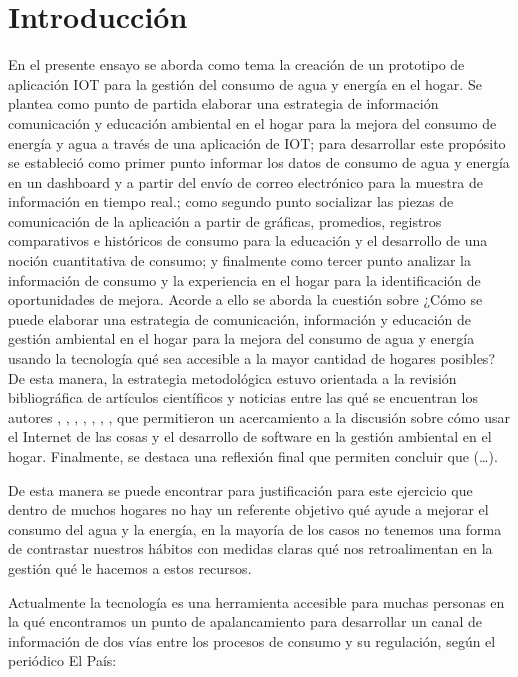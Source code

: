 \documentclass[a4paper,man,natbib]{apa6}
\begin{document}


\section{Introducción}
En el presente ensayo se aborda como tema la creación de un prototipo de aplicación IOT para la gestión del consumo de agua y energía en el hogar. Se plantea como punto de partida elaborar una estrategia de información comunicación y educación ambiental en el hogar para la mejora del consumo de energía y agua a través de una aplicación de IOT; para desarrollar este propósito se estableció como primer punto informar los datos de consumo de agua y energía en un dashboard y a partir del envío de correo electrónico para la muestra de información en tiempo real.; como segundo punto socializar las piezas de comunicación de la aplicación a partir de gráficas, promedios, registros comparativos e históricos de consumo para la educación y el desarrollo de una noción cuantitativa de consumo; y finalmente como tercer punto analizar la información de consumo y la experiencia en el hogar para la identificación de oportunidades de mejora. Acorde a ello se aborda la cuestión sobre ¿Cómo se puede elaborar una estrategia de comunicación, información y educación de gestión ambiental en el hogar para la mejora del consumo de agua y energía usando la tecnología qué sea accesible a la mayor cantidad de hogares posibles? De esta manera, la estrategia metodológica estuvo orientada a la revisión bibliográfica de artículos científicos y noticias entre las qué se encuentran los autores \citep{7398710}, \citep{8612412}, \citep{Aguaenel98:online}, \citep{Ahorrode59:online}, \citep{Betancourt20201}, \citep{Diadeagu32:online}, \citep{Enterate82:online}, \citep{Milesdem41:online} que permitieron un acercamiento a la discusión sobre cómo usar el Internet de las cosas y el desarrollo de software en la gestión ambiental en el hogar. Finalmente, se destaca una reflexión final que permiten concluir que (…).\newline

De esta manera se puede encontrar para justificación para este ejercicio que dentro de muchos hogares no hay un referente objetivo qué ayude a mejorar el consumo del agua y la energía, en la mayoría de los casos no tenemos una forma de contrastar nuestros hábitos con medidas claras qué nos retroalimentan en la gestión qué le hacemos a estos recursos.\newline

Actualmente la tecnología es una herramienta accesible para muchas personas en la qué encontramos un punto de apalancamiento para desarrollar un canal de información de dos vías entre los procesos de consumo y su regulación, según el periódico El País:\newline
\end{document}
